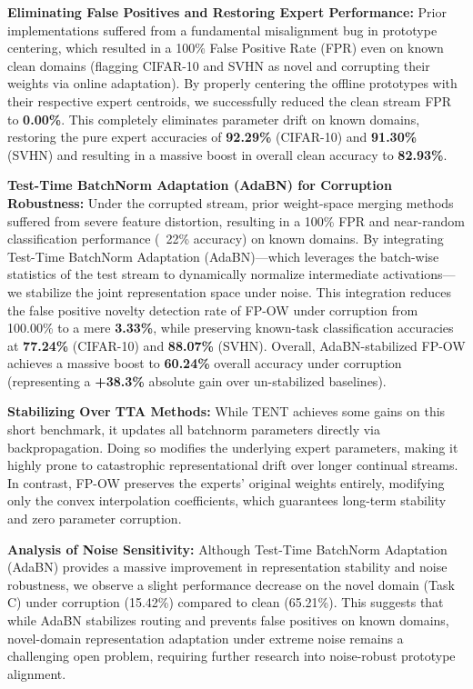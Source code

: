 \documentclass{article}
\theoremstyle{plain}
\theoremstyle{definition}
\theoremstyle{remark}
\begin{document}
\textbf{Eliminating False Positives and Restoring Expert Performance:} Prior implementations suffered from a fundamental misalignment bug in prototype centering, which resulted in a 100\% False Positive Rate (FPR) even on known clean domains (flagging CIFAR-10 and SVHN as novel and corrupting their weights via online adaptation). By properly centering the offline prototypes with their respective expert centroids, we successfully reduced the clean stream FPR to \textbf{0.00\%}. This completely eliminates parameter drift on known domains, restoring the pure expert accuracies of \textbf{92.29\%} (CIFAR-10) and \textbf{91.30\%} (SVHN) and resulting in a massive boost in overall clean accuracy to \textbf{82.93\%}.

\textbf{Test-Time BatchNorm Adaptation (AdaBN) for Corruption Robustness:} Under the corrupted stream, prior weight-space merging methods suffered from severe feature distortion, resulting in a 100\% FPR and near-random classification performance (~22\% accuracy) on known domains. By integrating Test-Time BatchNorm Adaptation (AdaBN)—which leverages the batch-wise statistics of the test stream to dynamically normalize intermediate activations—we stabilize the joint representation space under noise. This integration reduces the false positive novelty detection rate of FP-OW under corruption from 100.00\% to a mere \textbf{3.33\%}, while preserving known-task classification accuracies at \textbf{77.24\%} (CIFAR-10) and \textbf{88.07\%} (SVHN). Overall, AdaBN-stabilized FP-OW achieves a massive boost to \textbf{60.24\%} overall accuracy under corruption (representing a \textbf{+38.3\%} absolute gain over un-stabilized baselines).

\textbf{Stabilizing Over TTA Methods:} While TENT achieves some gains on this short benchmark, it updates all batchnorm parameters directly via backpropagation. Doing so modifies the underlying expert parameters, making it highly prone to catastrophic representational drift over longer continual streams. In contrast, FP-OW preserves the experts' original weights entirely, modifying only the convex interpolation coefficients, which guarantees long-term stability and zero parameter corruption.

\textbf{Analysis of Noise Sensitivity:} Although Test-Time BatchNorm Adaptation (AdaBN) provides a massive improvement in representation stability and noise robustness, we observe a slight performance decrease on the novel domain (Task C) under corruption (15.42\%) compared to clean (65.21\%). This suggests that while AdaBN stabilizes routing and prevents false positives on known domains, novel-domain representation adaptation under extreme noise remains a challenging open problem, requiring further research into noise-robust prototype alignment.
\end{document}
